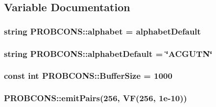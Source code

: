 \subsection{Variable Documentation}
\hypertarget{namespace_p_r_o_b_c_o_n_s_a1e5ecbd30c93a113dcef4ef53f00d110}{
\subsubsection[{alphabet}]{\setlength{\rightskip}{0pt plus 5cm}string P\+R\+O\+B\+C\+O\+N\+S\+::alphabet = {\bf alphabet\+Default}}}\label{namespace_p_r_o_b_c_o_n_s_a1e5ecbd30c93a113dcef4ef53f00d110}
\hypertarget{namespace_p_r_o_b_c_o_n_s_ae29cac54ccf09bf5f57237867b6da88b}{
\subsubsection[{alphabet\+Default}]{\setlength{\rightskip}{0pt plus 5cm}string P\+R\+O\+B\+C\+O\+N\+S\+::alphabet\+Default = \char`\"{}A\+C\+G\+U\+T\+N\char`\"{}}}\label{namespace_p_r_o_b_c_o_n_s_ae29cac54ccf09bf5f57237867b6da88b}
\hypertarget{namespace_p_r_o_b_c_o_n_s_ab9d548ecc7df58e583023207ab844623}{
\subsubsection[{Buffer\+Size}]{\setlength{\rightskip}{0pt plus 5cm}const int P\+R\+O\+B\+C\+O\+N\+S\+::\+Buffer\+Size = 1000}}\label{namespace_p_r_o_b_c_o_n_s_ab9d548ecc7df58e583023207ab844623}
\hypertarget{namespace_p_r_o_b_c_o_n_s_ae28575916501eeab36245ba0624d0640}{
\subsubsection[{emit\+Pairs}]{ P\+R\+O\+B\+C\+O\+N\+S\+::emit\+Pairs(256, {\bf V\+F}(256, 1e-\/10))}}\label{namespace_p_r_o_b_c_o_n_s_ae28575916501eeab36245ba0624d0640}
